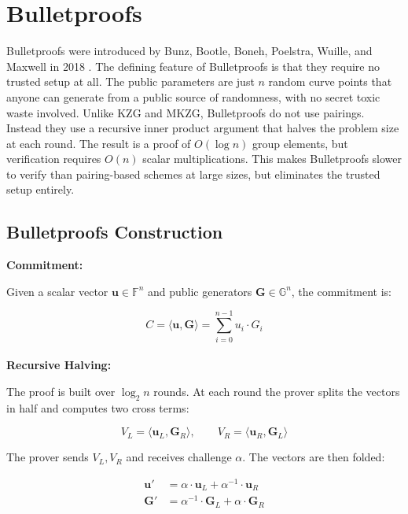 
\chapter{Bulletproofs}
\label{chap:bulletproofs}

Bulletproofs were introduced by Bunz, Bootle, Boneh, Poelstra,
Wuille, and Maxwell in 2018 \cite{bulletproofs2018}. The defining
feature of Bulletproofs is that they require no trusted setup at
all. The public parameters are just $n$ random curve points that
anyone can generate from a public source of randomness, with no
secret toxic waste involved.
Unlike KZG and MKZG, Bulletproofs do not use pairings. Instead they
use a recursive inner product argument that halves the problem size
at each round. The result is a proof of $O(\log n)$ group elements,
but verification requires $O(n)$ scalar multiplications. This makes
Bulletproofs slower to verify than pairing-based schemes at large
sizes, but eliminates the trusted setup entirely.

\section{Bulletproofs Construction}

\textbf{Commitment:}

Given a scalar vector $\mathbf{u} \in \mathbb{F}^n$ and public
generators $\mathbf{G} \in \mathbb{G}^n$, the commitment is:

\begin{equation}
    C = \langle \mathbf{u}, \mathbf{G} \rangle
      = \sum_{i=0}^{n-1} u_i \cdot G_i
\end{equation}
\\
\textbf{Recursive Halving:}

The proof is built over $\log_2 n$ rounds. At each round the prover
splits the vectors in half and computes two cross terms:

\begin{equation}
    V_L = \langle \mathbf{u}_L, \mathbf{G}_R \rangle, \qquad
    V_R = \langle \mathbf{u}_R, \mathbf{G}_L \rangle
\end{equation}

The prover sends $V_L, V_R$ and receives challenge $\alpha$. The
vectors are then folded:

\begin{align}
    \mathbf{u}' &= \alpha \cdot \mathbf{u}_L + \alpha^{-1} \cdot \mathbf{u}_R \\
    \mathbf{G}' &= \alpha^{-1} \cdot \mathbf{G}_L + \alpha \cdot \mathbf{G}_R
\end{align}

